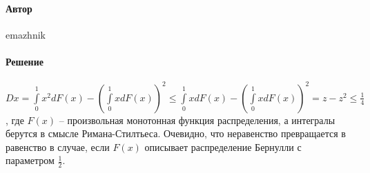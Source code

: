 \documentclass{article}
\begin{document}
\paragraph{Автор} emazhnik
\paragraph{Решение} $Dx = \int\limits_0^1 x^2 dF(x) - ( \int\limits_0^1 x dF(x) )^2 \leq \int\limits_0^1 x dF(x) - ( \int\limits_0^1 x dF(x) )^2 = z - z^2 \leq \frac14$, 
где $F(x)$ -- произвольная монотонная функция распределения, а интегралы берутся в смысле Римана-Стилтьеса.
Очевидно, что неравенство превращается в равенство в случае, если $F(x)$ описывает распределение Бернулли с параметром $\frac12$.
\end{document}
